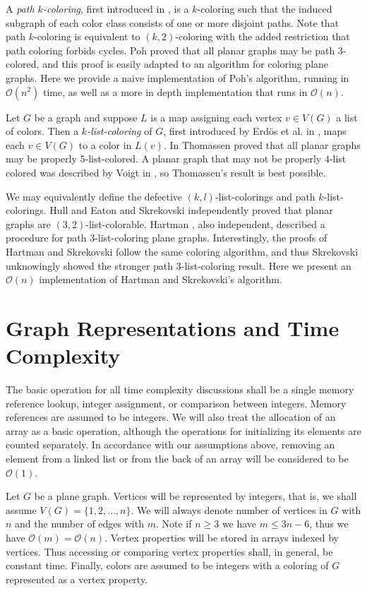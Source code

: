 \documentclass[letterpaper, 12pt]{amsart}
\theoremstyle{definition}
\theoremstyle{definition}
\theoremstyle{thm}
\theoremstyle{definition}
\begin{document}
A \textit{path $k$-coloring}, first introduced in \cite{harary}, is a
$k$-coloring such that the induced subgraph of each color class consists of one
or more disjoint paths. Note that path $k$-coloring is equivalent to
$(k,2)$-coloring with the added restriction that path coloring forbids cycles.
Poh \cite{poh} proved that all planar graphs may be path $3$-colored, and this
proof is easily adapted to an algorithm for coloring plane graphs. Here we
provide a naive implementation of Poh's algorithm, running in $\mathcal{O}(n^2)$
time, as well as a more in depth implementation that runs in $\mathcal{O}(n)$.

Let $G$ be a graph and suppose $L$ is a map assigning each vertex $v\in V(G)$ a
list of colors. Then a \textit{$k$-list-coloring} of $G$, first introduced
by Erd{\"o}s et al. in \cite{erdos}, maps each $v\in V(G)$ to a color in $L(v)$.
In \cite{thomassen} Thomassen proved that all planar graphs may be properly
$5$-list-colored. A planar graph that may not be properly $4$-list colored was
described by Voigt in \cite{voigt}, so Thomassen's result is best possible.

We may equivalently define the defective $(k,l)$-list-colorings and path
$k$-list-colorings. Hull and Eaton \cite{hull} and Skrekovski \cite{skrekovski}
independently proved that planar graphs are $(3,2)$-list-colorable. Hartman
\cite{hartman}, also independent, described a procedure for path
$3$-list-coloring plane graphs. Interestingly, the proofs of Hartman and
Skrekovski follow the same coloring algorithm, and thus Skrekovski
unknowingly showed the stronger path $3$-list-coloring result. Here we present
an $\mathcal{O}(n)$ implementation of Hartman and Skrekovski's algorithm.

\section{Graph Representations and Time Complexity}

The basic operation for all time complexity discussions shall be a single memory
reference lookup, integer assignment, or comparison between integers. Memory
references are assumed to be integers. We will also treat the allocation of an
array as a basic operation, although the operations for initializing its
elements are counted separately. In accordance with our assumptions above,
removing an element from a linked list or from the back of an array will be
considered to be $\mathcal{O}(1)$.

Let $G$ be a plane graph. Vertices will be represented by integers, that is, we
shall assume $V(G)=\{1,2,\ldots,n\}$. We will always denote
number of vertices in $G$ with $n$ and the number of edges with $m$. Note if
$n\ge 3$ we have $m\le 3n-6$, thus we have $\mathcal{O}(m)= \mathcal{O}(n)$.
Vertex properties will be stored in arrays indexed by vertices. Thus accessing
or comparing vertex properties shall, in general, be constant time. Finally,
colors are assumed to be integers with a coloring of $G$ represented as
a vertex property.
\end{document}
